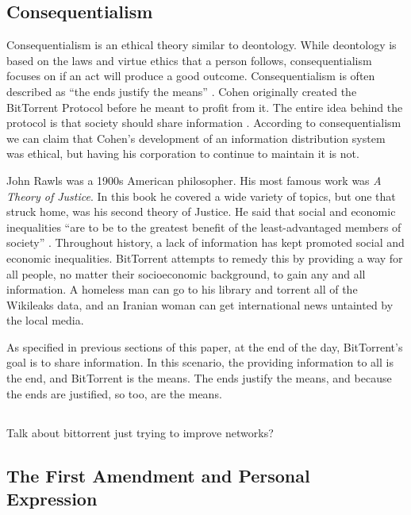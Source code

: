 \documentclass[11pt]{article}
\begin{document}
\begin{multicols}{2}
\subsection{Consequentialism}

Consequentialism is an ethical theory similar to deontology. While deontology is based on the laws and virtue ethics that a person follows, consequentialism focuses on if an act will produce a good outcome. Consequentialism is often described as ``the ends justify the means'' \cite{cons}. Cohen originally created the BitTorrent Protocol before he meant to profit from it. The entire idea behind the protocol is that society should share information \cite{btspec}. According to consequentialism we can claim that Cohen's development of an information distribution system was ethical, but having his corporation to continue to maintain it is not.

John Rawls was a 1900s American philosopher. His most famous work was \textit{A Theory of Justice}. In this book he covered a wide variety of topics, but one that struck home, was his second theory of Justice. He said that social and economic inequalities ``are to be to the greatest benefit of the least-advantaged members of society'' \cite{rawls}. Throughout history, a lack of information has kept promoted social and economic inequalities. BitTorrent attempts to remedy this by providing a way for all people, no matter their socioeconomic background, to gain any and all information. A homeless man can go to his library and torrent all of the Wikileaks data, and an Iranian woman can get international news untainted by the local media.

As specified in previous sections of this paper, at the end of the day, BitTorrent's goal is to share information. In this scenario, the providing information to all is the end, and BitTorrent is the means. The ends justify the means, and because the ends are justified, so too, are the means.

\subsection{}

Talk about bittorrent just trying to improve networks?

\subsection{The First Amendment and Personal Expression}


\end{multicols}
\end{document}
